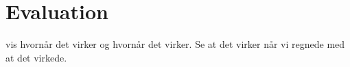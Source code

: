 
\section{Evaluation}

vis hvornår det virker og hvornår det virker. Se at det virker når vi regnede med at det virkede.
